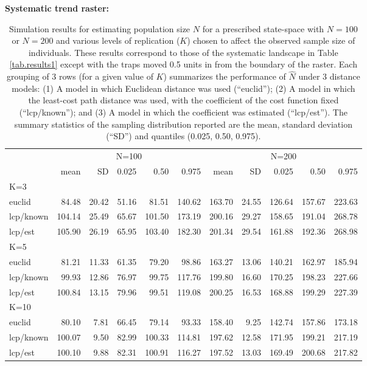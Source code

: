 \documentclass[12pt]{article}
\begin{document}
\begin{table}[ht]
{\small
\caption{Simulation results for estimating population size $N$ for a prescribed state-space with
$N=100$ or $N=200$ and various levels of replication ($K$) chosen to affect the observed sample
size of individuals. These results correspond to those of the
systematic landscape in Table \ref{tab.results1} except with the traps
moved 0.5 units in from the boundary of the raster.  
Each grouping of 3 rows (for a given value of $K$) summarizes the
performance of $\hat{N}$ under 3 distance models: (1) A model in which
Euclidean distance was used (``euclid''); (2) A model in which the
least-cost path distance was used, with the coefficient of the cost
function fixed (``lcp/known''); and (3) A model in which the
coefficient was estimated (``lcp/est''). The summary statistics of the
sampling distribution reported are the mean, standard deviation
(``SD'') and quantiles (0.025, 0.50, 0.975). 
}
{\bf Systematic trend raster:} \\
\begin{tabular}{l|rrrrr|rrrrr}
         & \multicolumn{5}{c}{N=100   } & \multicolumn{5}{c}{N=200  }  \\
         &   mean &  SD  & 0.025 & 0.50 & 0.975  & mean  & SD   & 0.025 & 0.50  & 0.975 \\ \hline
K=3      &        &      &       &      &        &       &      &       &       &       \\
euclid   &   84.48& 20.42& 51.16 & 81.51& 140.62 &163.70 &24.55 &126.64 &157.67 &223.63 \\
lcp/known&  104.14& 25.49& 65.67 &101.50& 173.19 &200.16 &29.27 &158.65 &191.04 &268.78\\
lcp/est  &  105.90& 26.19& 65.95 &103.40& 182.30 &201.34 &29.54 &161.88 &192.36 &268.98\\
K=5      &        &      &       &      &        &       &      &       &       &       \\
euclid   & 81.21  &11.33 &61.35  &79.20 & 98.86  &163.27 &13.06 &140.21 &162.97 &185.94\\
lcp/known& 99.93  &12.86 &76.97  &99.75 &117.76  &199.80 &16.60 &170.25 &198.23 &227.66\\
lcp/est  & 100.84 &13.15 &79.96  &99.51 &119.08  &200.25 &16.53 &168.88 &199.29 &227.39\\
K=10     &        &      &       &      &        &       &      &       &       &       \\
euclid   &  80.10 & 7.81 &66.45  &79.14 &93.33   &158.40 & 9.25 &142.74 &157.86 &173.18\\
lcp/known& 100.07 & 9.50 &82.99  &100.33&114.81  &197.62 &12.58 &171.95 &199.21 &217.19\\
lcp/est  & 100.10 & 9.88 &82.31  &100.91&116.27  &197.52 &13.03 &169.49 &200.68 &217.82\\ \hline
\end{tabular}
}
\label{tab.results3}
\end{table}
\end{document}
